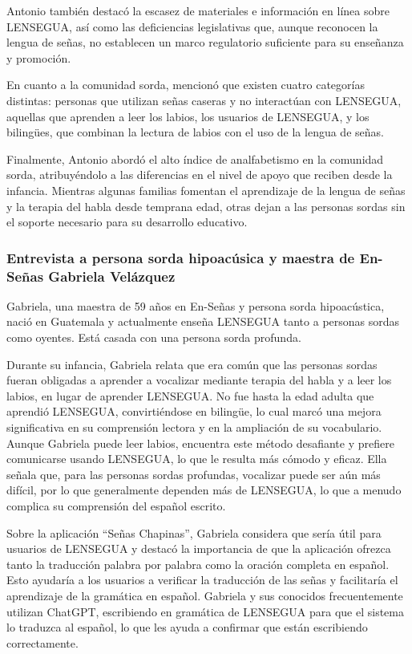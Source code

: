 Antonio también destacó la escasez de materiales e información en línea sobre LENSEGUA, así como las deficiencias legislativas que, aunque reconocen la lengua de señas, no establecen un marco regulatorio suficiente para su enseñanza y promoción.

En cuanto a la comunidad sorda, mencionó que existen cuatro categorías distintas: personas que utilizan señas caseras y no interactúan con LENSEGUA, aquellas que aprenden a leer los labios, los usuarios de LENSEGUA, y los bilingües, que combinan la lectura de labios con el uso de la lengua de señas.

Finalmente, Antonio abordó el alto índice de analfabetismo en la comunidad sorda, atribuyéndolo a las diferencias en el nivel de apoyo que reciben desde la infancia. Mientras algunas familias fomentan el aprendizaje de la lengua de señas y la terapia del habla desde temprana edad, otras dejan a las personas sordas sin el soporte necesario para su desarrollo educativo.

\subsubsection{Entrevista a persona sorda hipoacúsica y maestra de En-Señas Gabriela Velázquez}
Gabriela, una maestra de 59 años en En-Señas y persona sorda hipoacústica, nació en Guatemala y actualmente enseña LENSEGUA tanto a personas sordas como oyentes. Está casada con una persona sorda profunda. 

Durante su infancia, Gabriela relata que era común que las personas sordas fueran obligadas a aprender a vocalizar mediante terapia del habla y a leer los labios, en lugar de aprender LENSEGUA. No fue hasta la edad adulta que aprendió LENSEGUA, convirtiéndose en bilingüe, lo cual marcó una mejora significativa en su comprensión lectora y en la ampliación de su vocabulario. Aunque Gabriela puede leer labios, encuentra este método desafiante y prefiere comunicarse usando LENSEGUA, lo que le resulta más cómodo y eficaz. Ella señala que, para las personas sordas profundas, vocalizar puede ser aún más difícil, por lo que generalmente dependen más de LENSEGUA, lo que a menudo complica su comprensión del español escrito.

Sobre la aplicación ``Señas Chapinas'', Gabriela considera que sería útil para usuarios de LENSEGUA y destacó la importancia de que la aplicación ofrezca tanto la traducción palabra por palabra como la oración completa en español. Esto ayudaría a los usuarios a verificar la traducción de las señas y facilitaría el aprendizaje de la gramática en español. Gabriela y sus conocidos frecuentemente utilizan ChatGPT, escribiendo en gramática de LENSEGUA para que el sistema lo traduzca al español, lo que les ayuda a confirmar que están escribiendo correctamente.

